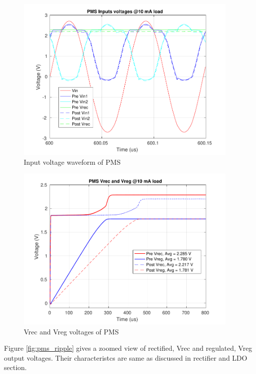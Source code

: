 \documentclass[12pt,a4paper,UKenglish]{report}
\begin{document}
\begin{figure} [!htb]
  \centering
  \includegraphics[width=0.96\textwidth]{img/pms/pms2_Vs_both.pdf} 
 \caption{Input voltage waveform of PMS} 
\label{fig:pms_vin} 
\end{figure}

\begin{figure} [H]
  \centering
  \includegraphics[width=0.96\textwidth]{img/pms/pms2_Vout_both.pdf} 
 \caption{Vrec and Vreg voltages of PMS} 
\label{fig:pms_vout} 
\end{figure}

Figure \ref{fig:pms_ripple} gives a zoomed view of rectified, Vrec and regulated, Vreg output voltages. Their 
characteristcs are same as discussed in rectifier and LDO section. \\
\end{document}

